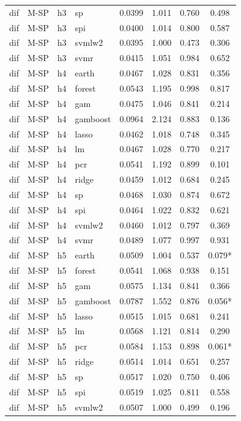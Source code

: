 \begin{ThreePartTable}
\begin{longtable}[t]{llclcccc}
dif & M-SP & h3 & sp & 0.0399 & 1.011 & 0.760 & 0.498\\
dif & M-SP & h3 & spi & 0.0400 & 1.014 & 0.800 & 0.587\\
dif & M-SP & h3 & svmlw2 & 0.0395 & 1.000 & 0.473 & 0.306\\
dif & M-SP & h3 & svmr & 0.0415 & 1.051 & 0.984 & 0.652\\
\addlinespace
dif & M-SP & h4 & earth & 0.0467 & 1.028 & 0.831 & 0.356\\
dif & M-SP & h4 & forest & 0.0543 & 1.195 & 0.998 & 0.817\\
dif & M-SP & h4 & gam & 0.0475 & 1.046 & 0.841 & 0.214\\
dif & M-SP & h4 & gamboost & 0.0964 & 2.124 & 0.883 & 0.136\\
dif & M-SP & h4 & lasso & 0.0462 & 1.018 & 0.748 & 0.345\\
dif & M-SP & h4 & lm & 0.0467 & 1.028 & 0.770 & 0.217\\
dif & M-SP & h4 & pcr & 0.0541 & 1.192 & 0.899 & 0.101\\
dif & M-SP & h4 & ridge & 0.0459 & 1.012 & 0.684 & 0.245\\
dif & M-SP & h4 & sp & 0.0468 & 1.030 & 0.874 & 0.672\\
dif & M-SP & h4 & spi & 0.0464 & 1.022 & 0.832 & 0.621\\
dif & M-SP & h4 & svmlw2 & 0.0460 & 1.012 & 0.797 & 0.369\\
dif & M-SP & h4 & svmr & 0.0489 & 1.077 & 0.997 & 0.931\\
\addlinespace
dif & M-SP & h5 & earth & 0.0509 & 1.004 & 0.537 & 0.079*\\
dif & M-SP & h5 & forest & 0.0541 & 1.068 & 0.938 & 0.151\\
dif & M-SP & h5 & gam & 0.0575 & 1.134 & 0.841 & 0.366\\
dif & M-SP & h5 & gamboost & 0.0787 & 1.552 & 0.876 & 0.056*\\
dif & M-SP & h5 & lasso & 0.0515 & 1.015 & 0.681 & 0.241\\
dif & M-SP & h5 & lm & 0.0568 & 1.121 & 0.814 & 0.290\\
dif & M-SP & h5 & pcr & 0.0584 & 1.153 & 0.898 & 0.061*\\
dif & M-SP & h5 & ridge & 0.0514 & 1.014 & 0.651 & 0.257\\
dif & M-SP & h5 & sp & 0.0517 & 1.020 & 0.750 & 0.406\\
dif & M-SP & h5 & spi & 0.0519 & 1.025 & 0.811 & 0.558\\
dif & M-SP & h5 & svmlw2 & 0.0507 & 1.000 & 0.499 & 0.196\\

\end{longtable}
\end{ThreePartTable}
